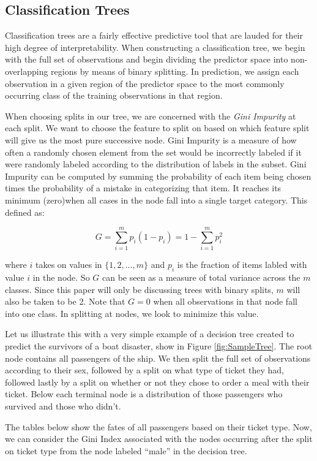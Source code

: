 \documentclass[preprint,12pt]{elsarticle}
\begin{document}
\subsection{Classification Trees}
Classification trees are a fairly effective predictive tool that are lauded for their high degree of interpretability. When constructing a classification tree, we begin with the full set of observations and begin dividing the predictor space into non-overlapping regions by means of binary splitting. In prediction, we assign each observation in a given region of the predictor space to the most commonly occurring class of the training observations in that region. 

When choosing splits in our tree, we are concerned with the \textit{Gini Impurity} at each split. We want to choose the feature to split on based on which feature split will give us the most pure successive node. Gini Impurity is a measure of how often a randomly chosen element from the set would be incorrectly labeled if it were randomly labeled according to the distribution of labels in the subset. Gini Impurity can be computed by summing the probability of each item being chosen times the probability of a mistake in categorizing that item. It reaches its minimum (zero)when all cases in the node fall into a single target category. This defined as:

$$G = \sum\limits_{i=1}^m p_{i}(1-p_{i}) = 1 - \sum\limits_{i=1}^m p_{i}^{2}$$

\noindent where $i$ takes on values in $\{1,2,\ldots,m\}$ and $p_i$ is the fraction of items labled with value $i$ in the node. So $G$ can be seen as a measure of total variance across the $m$ classes. Since this paper will only be discussing trees with binary splits, $m$ will also be taken to be 2. Note that $G = 0$ when all observations in that node fall into one class. In splitting at nodes, we look to minimize this value.

Let us illustrate this with a very simple example of a decision tree created to predict the survivors of a boat disaster, show in Figure \ref{fig:SampleTree}. The root node contains all passengers of the ship. We then split the full set of observations according to their sex, followed by a split on what type of ticket they had, followed lastly by a split on whether or not they chose to order a meal with their ticket. Below each terminal node is a distribution of those passengers who survived and those who didn't. 

The tables below show the fates of all passengers based on their ticket type. Now, we can consider the Gini Index associated with the nodes occurring after the split on ticket type from the node labeled ``male'' in the decision tree.
\end{document}
